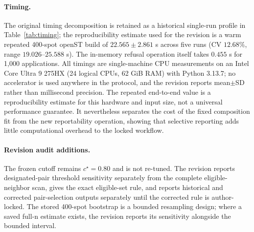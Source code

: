 \paragraph{Timing.}
The original timing decomposition is retained as a historical single-run profile in Table~\ref{tab:timing}; the reproducibility estimate used for the revision is a warm repeated 400-spot openST build of \(22.565\pm2.861\) s across five runs (CV \(12.68\%\), range \(19.026\)--\(25.588\) s). The in-memory refusal operation itself takes \(0.455\) s for 1,000 applications. All timings are single-machine CPU measurements on an Intel Core Ultra 9 275HX (24 logical CPUs, 62 GiB RAM) with Python 3.13.7; no accelerator is used anywhere in the protocol, and the revision reports mean\(\pm\)SD rather than millisecond precision. The repeated end-to-end value is a reproducibility estimate for this hardware and input size, not a universal performance guarantee. It nevertheless separates the cost of the fixed composition fit from the new reportability operation, showing that selective reporting adds little computational overhead to the locked workflow.

\paragraph{Revision audit additions.} The frozen cutoff remains \(c^\star=0.80\) and is not re-tuned. The revision reports designated-pair threshold sensitivity separately from the complete eligible-neighbor scan, gives the exact eligible-set rule, and reports historical and corrected pair-selection outputs separately until the corrected rule is author-locked. The stored 400-spot bootstrap is a bounded resampling design; where a saved full-n estimate exists, the revision reports its sensitivity alongside the bounded interval.
